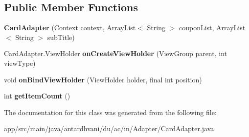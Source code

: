 \subsection*{Public Member Functions}
\begin{DoxyCompactItemize}
\item 
\hypertarget{classantardhvani_1_1du_1_1ac_1_1in_1_1_adapter_1_1_card_adapter_a58f2148d7942d422ed416755b1de0c17}{}{\bfseries Card\+Adapter} (Context context, Array\+List$<$ String $>$ coupon\+List, Array\+List$<$ String $>$ sub\+Title)\label{classantardhvani_1_1du_1_1ac_1_1in_1_1_adapter_1_1_card_adapter_a58f2148d7942d422ed416755b1de0c17}

\item 
\hypertarget{classantardhvani_1_1du_1_1ac_1_1in_1_1_adapter_1_1_card_adapter_a49c31c14056028c5836a44a36b171b73}{}Card\+Adapter.\+View\+Holder {\bfseries on\+Create\+View\+Holder} (View\+Group parent, int view\+Type)\label{classantardhvani_1_1du_1_1ac_1_1in_1_1_adapter_1_1_card_adapter_a49c31c14056028c5836a44a36b171b73}

\item 
\hypertarget{classantardhvani_1_1du_1_1ac_1_1in_1_1_adapter_1_1_card_adapter_ae135c558400c1760f0d0b0c4d9ba3f0a}{}void {\bfseries on\+Bind\+View\+Holder} (View\+Holder holder, final int position)\label{classantardhvani_1_1du_1_1ac_1_1in_1_1_adapter_1_1_card_adapter_ae135c558400c1760f0d0b0c4d9ba3f0a}

\item 
\hypertarget{classantardhvani_1_1du_1_1ac_1_1in_1_1_adapter_1_1_card_adapter_a29f08033c22b77982475b87a5fef4646}{}int {\bfseries get\+Item\+Count} ()\label{classantardhvani_1_1du_1_1ac_1_1in_1_1_adapter_1_1_card_adapter_a29f08033c22b77982475b87a5fef4646}

\end{DoxyCompactItemize}


The documentation for this class was generated from the following file\+:\begin{DoxyCompactItemize}
\item 
app/src/main/java/antardhvani/du/ac/in/\+Adapter/Card\+Adapter.\+java\end{DoxyCompactItemize}
